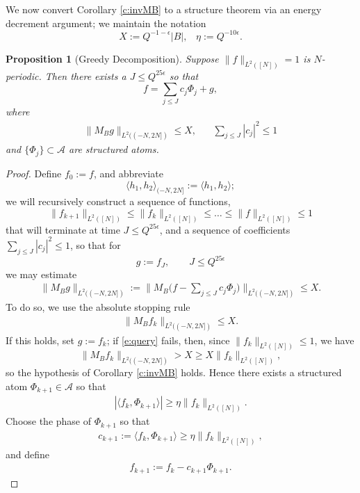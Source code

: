 \documentclass[12pt]{amsart}
\numberwithin{equation}{section}
\newtheorem{proposition}[theorem]{Proposition}
\theoremstyle{definition}
\begin{document}
We now convert Corollary \ref{c:invMB} to a structure theorem via an energy decrement argument; we maintain the notation
\[ X := Q^{-1-\epsilon} |B|, \; \; \; \eta := Q^{-10 \epsilon}.\]

\begin{proposition}[Greedy Decomposition]\label{p:greedy}
Suppose $\| f \|_{L^2([N])} = 1$ is $N$-periodic. Then there exists a $J \leq Q^{25 \epsilon}$ so that
\[ f = \sum_{j \leq J} c_j \Phi_j + g,\]
where
\begin{align}
    \| M_B g \|_{L^2( (-N,2N] )} \leq X, \; \; \; \;\;\;\sum_{j \leq J} |c_j|^2 \leq 1
\end{align}
and $\{ \Phi_j \} \subset \mathcal{A}$ are structured atoms.
\end{proposition}
\begin{proof}
    Define $f_0 := f$, and abbreviate
    \[ \langle h_1,h_2 \rangle_{(-N,2N]} := \langle h_1,h_2 \rangle;\]
    we will recursively construct a sequence of functions,
    \[ \| f_{k+1} \|_{L^2([N])} \leq \| f_k \|_{L^2([N])} \leq \dots \leq \|f\|_{L^2([N])} \leq 1\]   
that will terminate at time $J \leq Q^{25 \epsilon}$, and a sequence of coefficients $\sum_{j \leq J} |c_j|^2 \leq 1$, so that for
\[ g := f_{J}, \qquad J \leq Q^{25 \epsilon}\]
we may estimate
    \begin{align}
        \| M_B g \|_{L^2( (-N,2N] )} := \| M_B \big( f - \sum_{j \leq J} c_j \Phi_j \big) \|_{L^2( (-N,2N] )} \leq X.
    \end{align}
To do so, we use the absolute stopping rule
    \begin{align}\label{e:query}
        \| M_B f_k \|_{L^2( (-N,2N] )} \leq X.
    \end{align}
    If this holds, set $g := f_k$; 
    if \eqref{e:query} fails, then, since \(\|f_k\|_{L^2([N])}\le1\),
we have
\[
\|M_Bf_k\|_{L^2((-N,2N])}>X\ge X\|f_k\|_{L^2([N])},
\]
so the hypothesis of Corollary \ref{c:invMB} holds. Hence there exists a structured atom $\Phi_{k+1} \in \mathcal{A}$ so that
    \begin{align}
        |\langle f_k, \Phi_{k+1} \rangle| \geq \eta \|f_k \|_{L^2([N])}.
    \end{align}
Choose the phase of $\Phi_{k+1}$ so that
\begin{align}
    c_{k+1} := \langle f_k,\Phi_{k+1} \rangle \geq \eta \| f_k \|_{L^2([N])},
\end{align}
and define
\begin{align}
    f_{k+1} := f_k - c_{k+1} \Phi_{k+1}.
\end{align}

\end{proof}
\end{document}
